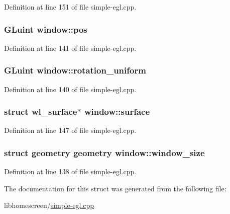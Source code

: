 Definition at line 151 of file simple-\/egl.\+cpp.

\subsubsection[{\texorpdfstring{pos}{pos}}]{\setlength{\rightskip}{0pt plus 5cm}G\+Luint window\+::pos}\hypertarget{structwindow_aaf965f90f9fc938db2315ff62028c362}{}\label{structwindow_aaf965f90f9fc938db2315ff62028c362}


Definition at line 141 of file simple-\/egl.\+cpp.

\subsubsection[{\texorpdfstring{rotation\+\_\+uniform}{rotation_uniform}}]{\setlength{\rightskip}{0pt plus 5cm}G\+Luint window\+::rotation\+\_\+uniform}\hypertarget{structwindow_a5202f3b60e262a6fa4fcee68dd47cb67}{}\label{structwindow_a5202f3b60e262a6fa4fcee68dd47cb67}


Definition at line 140 of file simple-\/egl.\+cpp.

\subsubsection[{\texorpdfstring{surface}{surface}}]{\setlength{\rightskip}{0pt plus 5cm}struct wl\+\_\+surface$\ast$ window\+::surface}\hypertarget{structwindow_a7d0790cfc7c30621611fa26ab5c1ae97}{}\label{structwindow_a7d0790cfc7c30621611fa26ab5c1ae97}


Definition at line 147 of file simple-\/egl.\+cpp.

\subsubsection[{\texorpdfstring{window\+\_\+size}{window_size}}]{\setlength{\rightskip}{0pt plus 5cm}struct {\bf geometry} {\bf geometry} window\+::window\+\_\+size}\hypertarget{structwindow_ad2b6c8ed8044b41fd1189a0ce26d539a}{}\label{structwindow_ad2b6c8ed8044b41fd1189a0ce26d539a}


Definition at line 138 of file simple-\/egl.\+cpp.



The documentation for this struct was generated from the following file\+:\begin{DoxyCompactItemize}
\item 
libhomescreen/\hyperlink{simple-egl_8cpp}{simple-\/egl.\+cpp}\end{DoxyCompactItemize}
